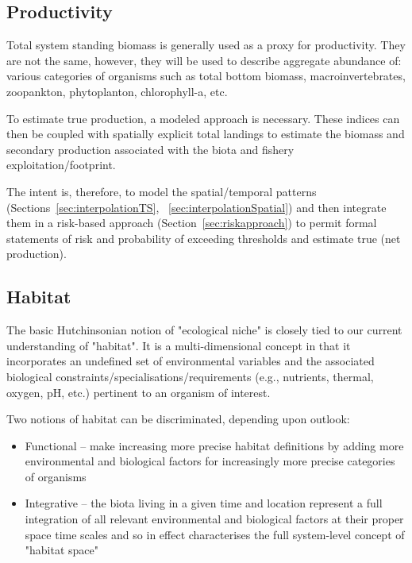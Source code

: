 \documentclass[letterpaper,portrait,11pt]{scrartcl}
\numberwithin{equation}{section}		%
\numberwithin{figure}{section}		%
\numberwithin{table}{section}				%
\begin{document}
\clearpage
\subsection{Productivity}

Total system standing biomass is generally used as a proxy for productivity. They are not the same, however, they will be used to describe aggregate abundance of: various categories of organisms such as total bottom biomass, macroinvertebrates, zoopankton, phytoplanton, chlorophyll-a, etc. 

To estimate true production, a modeled approach is necessary. These indices can then be coupled with spatially explicit total landings to estimate the biomass and secondary production associated with the biota and fishery exploitation/footprint. 

The intent is, therefore, to model the spatial/temporal patterns (Sections~\ref{sec:interpolationTS}, ~\ref{sec:interpolationSpatial}) and then integrate them in a risk-based approach (Section~\ref{sec:riskapproach}) to permit formal statements of risk and probability of exceeding thresholds and estimate true (net production). 

\clearpage
\subsection{Habitat}

The basic Hutchinsonian notion of "ecological niche" is closely tied to our current understanding of "habitat". It is a multi-dimensional concept in that it incorporates an undefined set of  environmental variables and the associated biological constraints/specialisations/requirements (e.g., nutrients, thermal, oxygen, pH, etc.) pertinent to an organism of interest. 

Two notions of habitat can be discriminated, depending upon outlook: 

\begin{itemize}
  \item Functional -- make increasing more precise habitat definitions by adding more environmental and biological factors for increasingly more precise categories of organisms   
  \item Integrative -- the biota living in a given time and location represent a full integration of all relevant environmental and biological factors at their proper space time scales and so in effect characterises the full system-level concept of "habitat space" 
\end{itemize}
\end{document}
